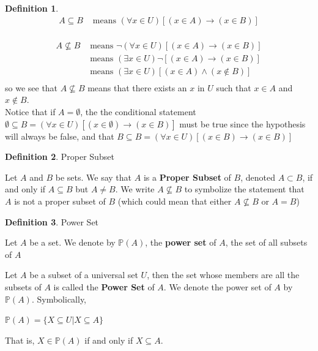 \documentclass{book}
\theoremstyle{definition}
\newtheorem{definition}{Definition}[section]
\theoremstyle{remark}
\begin{document}
\begin{definition}
    \begin{align*}
    A \subseteq B & \text{ means } (\forall x \in U) [(x \in A) \to (x \in B)] \nonumber \\
    \end{align*}
    
    \begin{align*}
    A \nsubseteq B & \text{ means } \neg (\forall x \in U) [(x \in A) \to (x \in B)] \nonumber\\
           & \text{ means } (\exists x \in U) \neg [(x \in A) \to (x \in B)] \nonumber\\
           & \text{ means } (\exists x \in U) [(x \in A) \wedge (x \notin B)] \nonumber\\
    \end{align*}
    so we see that $A \nsubseteq B$ means  that there exists an $x$ in $U$ such that $x \in A$ and $x \notin B$. \\
    
    Notice that if $A = \emptyset$, the the conditional statement $ \emptyset \subseteq B = (\forall x \in U) [(x \in \emptyset) \to (x \in B)]$ must be true since the hypothesis will always be false, and that  $B \subseteq B = (\forall x \in U) [(x \in B) \to (x \in B)]$

\end{definition}


\begin{definition}
Proper Subset \\

    \begin{tcolorbox}
        Let $A$ and $B$ be sets. We say that $A$ is a \textbf{Proper Subset} of $B$, denoted $A \subset B$, if and only if $A \subseteq B$ but $A \neq B$. We write $A \nsubseteq B$ to symbolize the statement that $A$ is not a proper subset of $B$ (which could mean that either $A \nsubseteq B$ or $A = B$)
    \end{tcolorbox}
    \end{definition}
    
    
\begin{definition}
Power Set \\
    
    \begin{tcolorbox}
    Let $A$ be a set. We denote by $\mathbb{P}(A)$, the \textbf{power set} of $A$, the set of all subsets of $A$
    
    Let $A$ be a subset of a universal set $U$, then the set whose members are all the subsets of $A$ is called the \textbf{Power Set} of $A$. We denote the power set of $A$ by $\mathbb{P}(A)$. Symbolically,
        \begin{center}
            $\mathbb{P}(A) = \{ X \subseteq U | X \subseteq A \}$ 
        \end{center}
    That is, $X \in \mathbb{P}(A)$ if and only if $X \subseteq A$. 
    \end{tcolorbox}

\end{definition}
\end{document}

